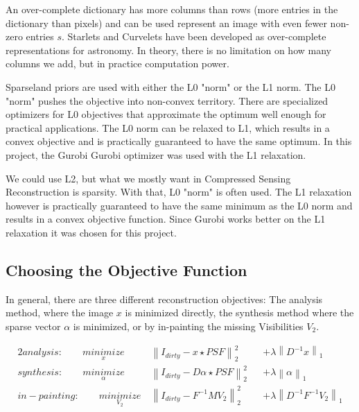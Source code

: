 An over-complete dictionary has more columns than rows (more entries in the dictionary than pixels) and can be used represent an image with even fewer non-zero entries $s$. Starlets\cite{starck2015starlet} and Curvelets\cite{starck2003astronomical} have been developed as over-complete representations for astronomy. In theory, there is no limitation on how many columns we add, but in practice computation power.

Sparseland priors are used with either the L0 "norm" or the L1 norm. The L0 "norm" pushes the objective into non-convex territory. There are specialized optimizers for L0 objectives that approximate the optimum well enough for practical applications. The L0 norm can be relaxed to L1, which results in a convex objective and is practically guaranteed to have the same optimum. In this project, the Gurobi Gurobi\cite{gurobi2018optimizer} optimizer was used with the L1 relaxation.

We could use L2, but what we mostly want in Compressed Sensing Reconstruction is sparsity. 
With that, L0 "norm" is often used. 
The L1 relaxation however is practically guaranteed to have the same minimum as the L0 norm and results in a convex objective function. Since Gurobi works better on the L1 relaxation it was chosen for this project.


\subsection{Choosing the Objective Function} \label{cs:objective}
In general, there are three different reconstruction objectives: The analysis method, where the image $x$ is minimized directly, the synthesis method where the sparse vector $\alpha$ is minimized, or by in-painting the missing Visibilities $V_2$.

\begin{alignat*}{2}
analysis:\qquad \underset{x}{minimize} \:& \left \| I_{dirty} - x \star PSF \right \|_2^2 &&+  \lambda \left \| D^{-1}x \right \|_1 \\
synthesis:\qquad \underset{\alpha}{minimize} \:& \left \| I_{dirty} - D \alpha \star PSF \right \|_2^2 &&+ \lambda \left \| \alpha \right \|_1 \\
in-painting:\qquad \underset{V_2}{minimize} \:& \left \|  I_{dirty} - F^{-1} M V_2 \right \|_2^2 &&+ \lambda \left \| D^{-1}F^{-1}V_2\right \|_1
\end{alignat*}

